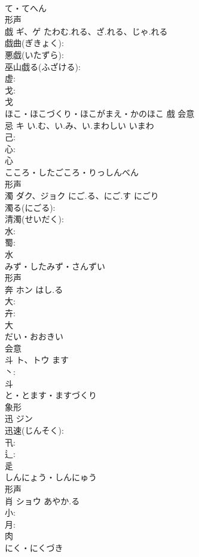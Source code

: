 \documentclass[8pt]{extreport}
\begin{document}
\begin{CJK}{UTF8}{min}
\\	て・てへん	
\\	形声 
\\	戯	ギ、ゲ	たわむ.れる、ざ.れる、じゃ.れる		
\\	戯曲(ぎきょく): 
\\	悪戯(いたずら): 
\\	巫山戯る(ふざける): 
\\	虚: 
\\	戈: 
\\	戈	
\\	ほこ・ほこづくり・ほこがまえ・かのほこ	戲	会意 
\\	忌	キ	い.む、い.み、い.まわしい	いまわ	
\\	己: 
\\	心: 
\\	心	
\\	こころ・したごころ・りっしんべん	
\\	形声 
\\	濁	ダク、ジョク	にご.る、にご.す	にごり	
\\	濁る(にごる): 
\\	清濁(せいだく): 
\\	水: 
\\	蜀: 
\\	水	
\\	みず・したみず・さんずい	
\\	形声 
\\	奔	ホン	はし.る		
\\	大: 
\\	卉: 
\\	大	
\\	だい・おおきい	
\\	会意 
\\	斗	ト、トウ		ます	
\\	丶: 
\\	斗	
\\	と・とます・ますづくり	
\\	象形 
\\	迅	ジン			
\\	迅速(じんそく): 
\\	卂: 
\\	辶: 
\\	辵	
\\	しんにょう・しんにゅう	
\\	形声 
\\	肖	ショウ	あやか.る		
\\	小: 
\\	月: 
\\	肉	
\\	にく・にくづき	

\end{CJK}
\end{document}
